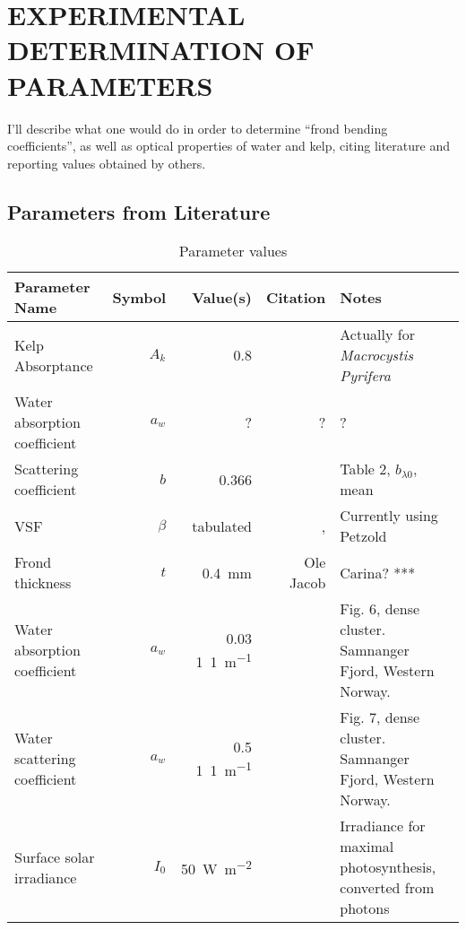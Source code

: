 \chapter{EXPERIMENTAL DETERMINATION OF PARAMETERS} \label{ch:experiment}

I'll describe what one would do in order to determine
``frond bending coefficients'', as well as optical properties of water and kelp,
citing literature and reporting values obtained by others.

\section{Parameters from Literature}
\begin{table}
  \centering
  \begin{tabular}{p{}rrrp{}}
    \toprule
    Parameter Name & Symbol & Value(s) & Citation & Notes \\
    \midrule
    Kelp Absorptance & $A_k$ & 0.8 & \cite{colombo-pallotta_photosynthetic_2006} & Actually for \textit{Macrocystis Pyrifera}\\
    Water absorption coefficient & $a_w$ & ? & ? & ? \\
    Scattering coefficient & $b$ & 0.366 & \cite{sokolov_parameterization_2010} & Table 2, $b_{\lambda 0}$, mean \\
    VSF & $\beta$ & tabulated & \cite{petzold_volume_1972,sokolov_parameterization_2010}, & Currently using Petzold \\ 
    Frond thickness & $t$ & \SI{0.4}{\mm} & Ole Jacob & Carina?  *** \\
    Water absorption coefficient & $a_w$ & 0.03 \SI{1}{1\per\m} & \cite{hamre_parameterization_2003} & Fig. 6, dense cluster. Samnanger Fjord, Western Norway. \\
    Water scattering coefficient & $a_w$ & 0.5 \SI{1}{1\per\m} & \cite{hamre_parameterization_2003} & Fig. 7, dense cluster. Samnanger Fjord, Western Norway. \\
    Surface solar irradiance & $I_0$ & \SI{50}{\W\per\m\squared} & \cite{broch_modelling_2012} & Irradiance for maximal photosynthesis, converted from photons \\
    \bottomrule
  \end{tabular}
  \caption{Parameter values}
\end{table}

